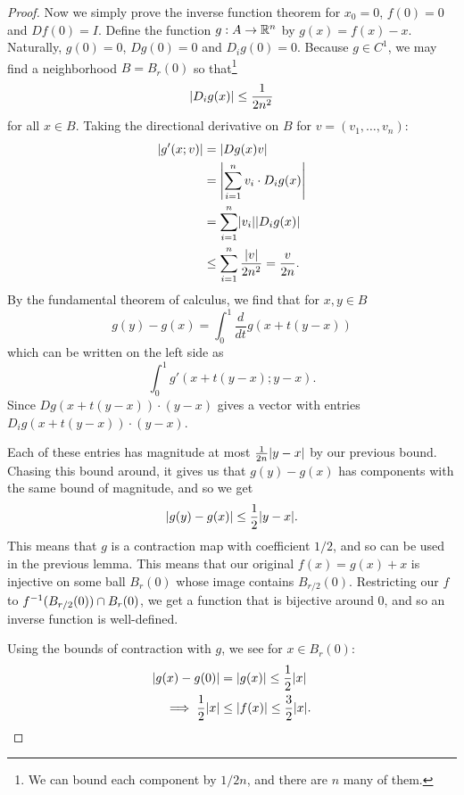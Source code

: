 \documentclass{article}
\begin{document}
\begin{proof}
  Now we simply prove the inverse function theorem for $x_{0} = 0$, $f(0) = 0$ and $Df(0) = I$.
  Define the function $g: A \to \RR[n]$ by $g(x) = f(x) - x$. Naturally, $g(0) = 0$, $Dg(0) = 0$ and $D_{i}g(0) = 0$.
  Because $g \in C^{1}$, we may find a neighborhood $B = B_{r}(0)$ so that\footnote{We can bound each component by $1/2n$, and there are $n$ many of them.}
  \[ \abs{D_{i}g(x)} \le \frac{1}{2n^{2}} \]
  for all $x \in B$.
  Taking the directional derivative on $B$ for $v = (v_{1}, \ldots, v_{n})$:
  \begin{align*}
    \abs{g'(x; v)} &= \abs{Dg(x)v}\\
    &= \abs*{\sum_{i = 1}^{n}v_{i} \cdot D_{i}g(x)}\\
    &= \sum_{i = 1}^{n}\abs{v_{i}} \abs{D_{i}g(x)}\\
    &\le \sum_{i = 1}^{n}\frac{\abs{v}}{2n^{2}} = \frac{v}{2n}.
  \end{align*}
  By the fundamental theorem of calculus, we find that for $x, y \in B$
  \[ g(y) - g(x) = \int_{0}^{1}\frac{d}{dt}g(x + t(y - x)) \]
  which can be written on the left side as
  \[ \int_{0}^{1} g'(x + t(y - x); y - x). \]
  Since $Dg(x + t(y - x)) \cdot (y - x)$ gives a vector with entries $D_{i}g(x + t(y - x)) \cdot (y - x)$.

  Each of these entries has magnitude at most $\frac{1}{2n} \abs{y - x}$ by our previous bound.
  Chasing this bound around, it gives us that $g(y) - g(x)$ has components with the same bound of magnitude, and so we get
  \[ \abs{g(y) - g(x)} \le \frac{1}{2}\abs{y - x}. \]
  This means that $g$ is a contraction map with coefficient $1/2$, and so can be used in the previous lemma.
  This means that our original $f(x) = g(x) + x$ is injective on some ball $B_{r}(0)$ whose image contains $B_{r/2}(0)$.
  Restricting our $f$ to $f\inv(B_{r/2}(0)) \cap B_{r}(0)$, we get a function that is bijective around 0, and so an inverse function is well-defined.

  Using the bounds of contraction with $g$, we see for $x \in B_{r}(0)$:
  \begin{align}
    \label{eq:contraction-bounds}
    \begin{split}
      \abs{g(x) - g(0)} &= \abs{g(x)} \le \frac{1}{2}\abs{x}\\
      \implies
      \frac{1}{2}\abs{x} &\le \abs{f(x)} \le \frac{3}{2}\abs{x}.
    \end{split}
  \end{align}


\end{proof}
\end{document}
